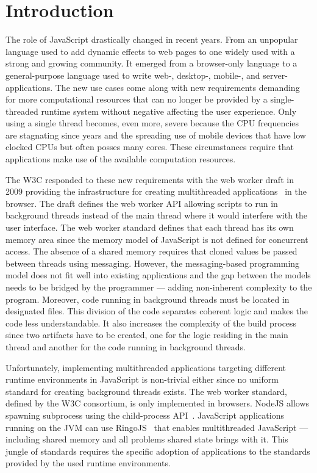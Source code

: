 \section{Introduction}\label{sec:introduction}
The role of JavaScript drastically changed in recent years. From an unpopular language used to add dynamic effects to web pages to one widely used with a strong and growing community. It emerged from a browser-only language to a general-purpose language used to write web-, desktop-, mobile-, and server-applications. The new use cases come along with new requirements demanding for more computational resources that can no longer be provided by a single-threaded runtime system without negative affecting the user experience. Only using a single thread becomes, even more, severe because the CPU frequencies are stagnating since years and the spreading use of mobile devices that have low clocked CPUs but often posses many cores. These circumstances require that applications make use of the available computation resources. 

The W3C responded to these new requirements with the web worker draft in 2009 providing the infrastructure for creating multithreaded applications~\cite{w3cWebWorker} in the browser. The draft defines the web worker API allowing scripts to run in background threads instead of the main thread where it would interfere with the user interface. The web worker standard defines that each thread has its own memory area since the memory model of JavaScript is not defined for concurrent access. The absence of a shared memory requires that cloned values be passed between threads using messaging. However, the messaging-based programming model does not fit well into existing applications and the gap between the models needs to be bridged by the programmer --- adding non-inherent complexity to the program. Moreover, code running in background threads must be located in designated files. This division of the code separates coherent logic and makes the code less understandable. It also increases the complexity of the build process since two artifacts have to be created, one for the logic residing in the main thread and another for the code running in background threads. 

Unfortunately, implementing multithreaded applications targeting different runtime environments in JavaScript is non-trivial either since no uniform standard for creating background threads exists. The web worker standard, defined by the W3C consortium, is only implemented in browsers. NodeJS allows spawning subprocess using the child-process API~\cite{childProcess}. JavaScript applications running on the JVM can use RingoJS~\cite{RingoJS} that enables multithreaded JavaScript --- including shared memory and all problems shared state brings with it. This jungle of standards requires the specific adoption of applications to the standards provided by the used runtime environments.

